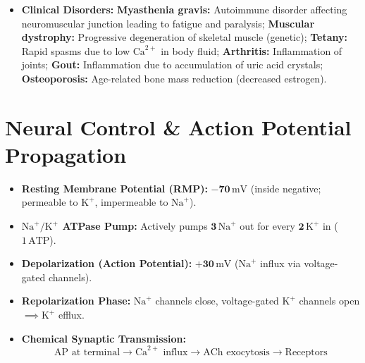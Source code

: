 \documentclass[10pt,twoside,openright]{book}
\begin{document}
\begin{conceptbox}
\begin{itemize}[leftmargin=*]
\begin{itemize}
    \item \textbf{Synovial (Diarthroses):} Freely movable fluid-filled synovial joints: Ball and socket (shoulder, hip); Hinge (knee, elbow); Pivot (Atlas and Axis, $C_1-C_2$); Gliding (between carpals); Saddle (between carpal and metacarpal of thumb).
  \end{itemize}
  \item \textbf{Clinical Disorders:} \textbf{Myasthenia gravis:} Autoimmune disorder affecting neuromuscular junction leading to fatigue and paralysis; \textbf{Muscular dystrophy:} Progressive degeneration of skeletal muscle (genetic); \textbf{Tetany:} Rapid spasms due to low $\mathrm{Ca}^{2+}$ in body fluid; \textbf{Arthritis:} Inflammation of joints; \textbf{Gout:} Inflammation due to accumulation of uric acid crystals; \textbf{Osteoporosis:} Age-related bone mass reduction (decreased estrogen).
\end{itemize}
\end{conceptbox}

\section{Neural Control \& Action Potential Propagation}

\begin{formulabox}
\begin{itemize}[leftmargin=*]
  \item \textbf{Resting Membrane Potential (RMP):} $\mathbf{-70\,\mathrm{mV}}$ (inside negative; permeable to $\mathrm{K}^+$, impermeable to $\mathrm{Na}^+$).
  \item \textbf{$\mathrm{Na}^+/\mathrm{K}^+$ ATPase Pump:} Actively pumps $\mathbf{3\,\mathrm{Na}^+}$ out for every $\mathbf{2\,\mathrm{K}^+}$ in ($1\,\mathrm{ATP}$).
  \item \textbf{Depolarization (Action Potential):} $\mathbf{+30\,\mathrm{mV}}$ ($\mathrm{Na}^+$ influx via voltage-gated channels).
  \item \textbf{Repolarization Phase:} $\mathrm{Na}^+$ channels close, voltage-gated $\mathrm{K}^+$ channels open $\implies \mathrm{K}^+$ efflux.
  \item \textbf{Chemical Synaptic Transmission:}
  \[
    \text{AP at terminal} \longrightarrow \mathrm{Ca}^{2+}\text{ influx} \longrightarrow \text{ACh exocytosis} \longrightarrow \text{Receptors}
  \]
\end{itemize}
\end{formulabox}
\end{document}
